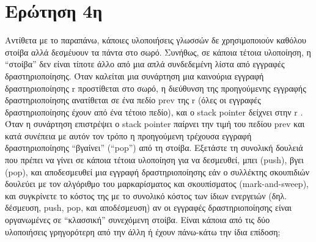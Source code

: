 \documentclass[a4paper]{article}
\begin{document}
\section*{Ερώτηση 4η}
Αντίθετα με το παραπάνω, κάποιες υλοποιήσεις γλωσσών δε χρησιμοποιούν καθόλου στοίβα αλλά
δεσμέυουν τα πάντα στο σωρό. Συνήθως, σε κάποια τέτοια υλοποίηση, η “στοίβα” δεν είναι τίποτε άλλο από μια απλά συνδεδεμένη λίστα από εγγραφές δραστηριοποίησης. Όταν καλείται μια
συνάρτηση μια καινούρια εγγραφή δραστηριοποίησης
\foreignlanguage{english}{r}
προστίθεται στο σωρό, η διεύθυνση της
προηγούμενης εγγραφής δραστηριοποίησης ανατίθεται σε ένα πεδίο
\foreignlanguage{english}{prev}
της
\foreignlanguage{english}{r}
(όλες οι εγγραφές
δραστηριοποίησης έχουν από ένα τέτοιο πεδίο), και ο \foreignlanguage{english}{stack pointer} δείχνει στην
\foreignlanguage{english}{r}
. Όταν η συνάρτηση επιστρέψει ο \foreignlanguage{english}{stack pointer} παίρνει την τιμή του πεδίου
\foreignlanguage{english}{prev}
και κατά συνέπεια με αυτόν τον
τρόπο η προηγούμενη τρέχουσα εγγραφή δραστηριοποίησης “βγαίνει” (“\foreignlanguage{english}{pop}”) από τη στοίβα.
Εξετάστε τη συνολική δουλειά που πρέπει να γίνει σε κάποια τέτοια υλοποίηση για να δεσμευθεί,
μπει (\foreignlanguage{english}{push}), βγει (\foreignlanguage{english}{pop}), και αποδεσμευθεί μια εγγραφή δραστηριοποίησης εάν ο συλλέκτης σκουπιδιών δουλεύει με τον αλγόριθμο του μαρκαρίσματος και σκουπίσματος (\foreignlanguage{english}{mark-and-sweep}), και
συγκρίνετε το κόστος της με το συνολικό κόστος των ίδιων ενεργειών (δηλ. δέσμευση, \foreignlanguage{english}{push, pop},
και αποδέσμευση) αν οι εγγραφές δραστηριοποίησης είναι οργανωμένες σε “κλασσική” συνεχόμενη στοίβα. Είναι κάποια από τις δύο υλοποιήσεις γρηγορότερη από την άλλη ή έχουν πάνω-κάτω
την ίδια επίδοση;
\end{document}
